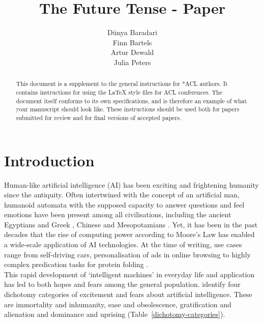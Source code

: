 \documentclass[11pt]{article}
\title{The Future Tense - Paper}
\author{Dünya Baradari\\\And
  Finn Bartels \\\And
  Artur Dewald \\\And
  Julia Peters}
\begin{document}
\maketitle
\begin{abstract}
This document is a supplement to the general instructions for *ACL authors. It contains instructions for using the \LaTeX{} style files for ACL conferences.
The document itself conforms to its own specifications, and is therefore an example of what your manuscript should look like.
These instructions should be used both for papers submitted for review and for final versions of accepted papers.
\end{abstract} 

\section{Introduction}

Human-like artificial intelligence (AI) has been exciting and frightening humanity since the antiquity. Often intertwined with the concept of an artificial man, humanoid automata with the supposed capacity to answer questions and feel emotions have been present among all civilisations, including the ancient Egyptians and Greek \citep{Newquist1994}, Chinese \citep{cohen1986} and Mesopotamians \citep{unat2008}. Yet, it has been in the past decades that the rise of computing power according to Moore’s Law has enabled a wide-scale application of AI technologies. At the time of writing, use cases range from self-driving cars, personalisation of ads in online browsing to highly complex predication tasks for protein folding \citep{jumper2021}. \\
This rapid development of ‘intelligent machines’ in everyday life and application has led to both hopes and fears among the general population. \citet{cave2019} identify four dichotomy categories of excitement and fears about artificial intelligence. These are immortality and inhumanity, ease and obsolescence, gratification and alienation and dominance and uprising (Table~\ref{dichotomy-categories}).
\end{document}
